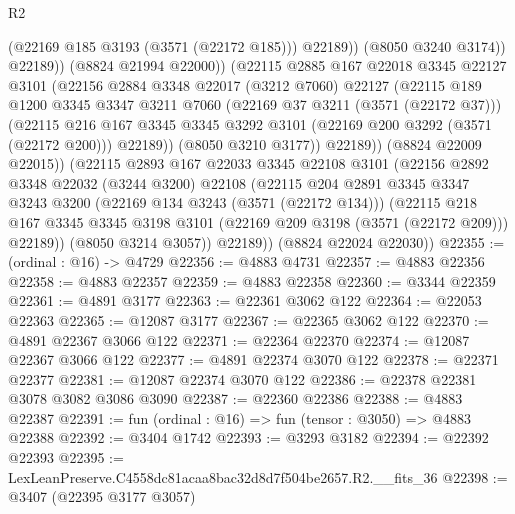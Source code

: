 \begin{lexlean}{R2}
\begin{coremodule}
                        (@22169 @185 @3193 (@3571 (@22172 @185)))
                        @22189))
                    (@8050 @3240 @3174))
                  @22189))
              (@8824 @21994 @22000))
            (@22115
              @2885
              @167
              @22018
              @3345
              @22127
              @3101
              (@22156
                @2884
                @3348
                @22017
                (@3212 @7060)
                @22127
                (@22115
                  @189
                  @1200
                  @3345
                  @3347
                  @3211
                  @7060
                  (@22169 @37 @3211 (@3571 (@22172 @37)))
                  (@22115
                    @216
                    @167
                    @3345
                    @3345
                    @3292
                    @3101
                    (@22169 @200 @3292 (@3571 (@22172 @200)))
                    @22189))
                (@8050 @3210 @3177))
              @22189))
          (@8824 @22009 @22015))
        (@22115
          @2893
          @167
          @22033
          @3345
          @22108
          @3101
          (@22156
            @2892
            @3348
            @22032
            (@3244 @3200)
            @22108
            (@22115
              @204
              @2891
              @3345
              @3347
              @3243
              @3200
              (@22169 @134 @3243 (@3571 (@22172 @134)))
              (@22115
                @218
                @167
                @3345
                @3345
                @3198
                @3101
                (@22169 @209 @3198 (@3571 (@22172 @209)))
                @22189))
            (@8050 @3214 @3057))
          @22189))
      (@8824 @22024 @22030))
@22355 := (ordinal : @16) -> @4729
@22356 := @4883 @4731
@22357 := @4883 @22356
@22358 := @4883 @22357
@22359 := @4883 @22358
@22360 := @3344 @22359
@22361 := @4891 @3177
@22363 := @22361 @3062 @122
@22364 := @22053 @22363
@22365 := @12087 @3177
@22367 := @22365 @3062 @122
@22370 := @4891 @22367 @3066 @122
@22371 := @22364 @22370
@22374 := @12087 @22367 @3066 @122
@22377 := @4891 @22374 @3070 @122
@22378 := @22371 @22377
@22381 := @12087 @22374 @3070 @122
@22386 := @22378 @22381 @3078 @3082 @3086 @3090
@22387 := @22360 @22386
@22388 := @4883 @22387
@22391 := fun (ordinal : @16) => fun (tensor : @3050) => @4883 @22388
@22392 := @3404 @1742
@22393 := @3293 @3182
@22394 := @22392 @22393
@22395 := LexLeanPreserve.C4558dc81acaa8bac32d8d7f504be2657.R2.__fits_36
@22398 := @3407 (@22395 @3177 @3057)

\end{coremodule}
\end{lexlean}
